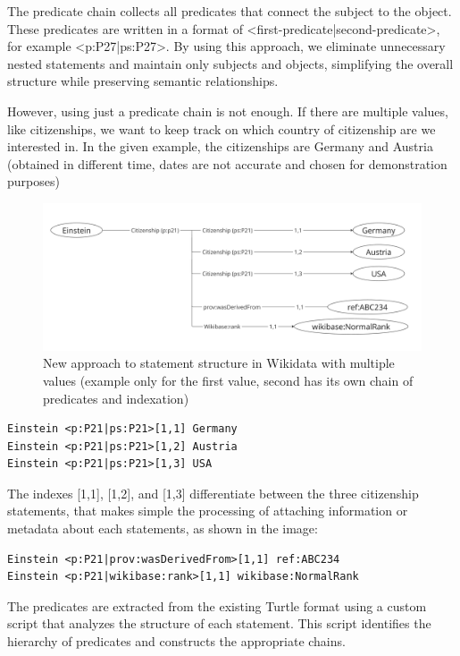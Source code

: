 The predicate chain collects all predicates that connect the subject to the object. These predicates are written in a format of <first-predicate|second-predicate>, for example <p:P27|ps:P27>. By using this approach, we eliminate unnecessary nested statements and maintain only subjects and objects, simplifying the overall structure while preserving semantic relationships.

However, using just a predicate chain is not enough. If there are multiple values, like citizenships, we want to keep track on which country of citizenship are we interested in. In the given example, the citizenships are Germany and Austria (obtained in different time, dates are not accurate and chosen for demonstration purposes)

\begin{figure}[htbp]
    \centering
    \includegraphics[width=1\textwidth]{17.png}
    \caption{New approach to statement structure in Wikidata with multiple values (example only for the first value, second has its own chain of predicates and indexation)}
    \label{fig:image17}
\end{figure}

{\footnotesize
\begin{verbatim}
Einstein <p:P21|ps:P21>[1,1] Germany
Einstein <p:P21|ps:P21>[1,2] Austria
Einstein <p:P21|ps:P21>[1,3] USA
\end{verbatim}
}

The indexes [1,1], [1,2], and [1,3] differentiate between the three citizenship statements, that makes simple the processing of attaching information or metadata about each statements, as shown in the image:

{\footnotesize
\begin{verbatim}
Einstein <p:P21|prov:wasDerivedFrom>[1,1] ref:ABC234
Einstein <p:P21|wikibase:rank>[1,1] wikibase:NormalRank
\end{verbatim}
}

The predicates are extracted from the existing Turtle format using a custom script that analyzes the structure of each statement. This script identifies the hierarchy of predicates and constructs the appropriate chains.

